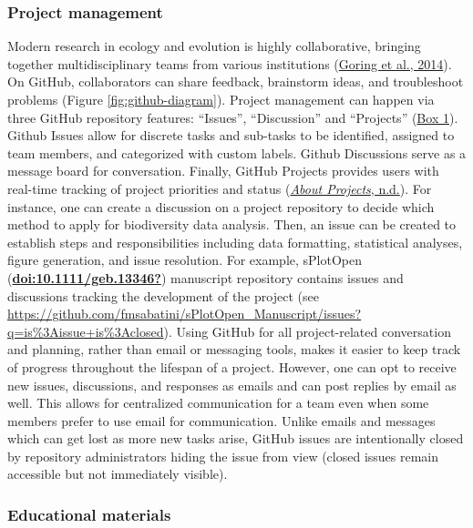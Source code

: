 \hypertarget{project-management}{%
\subsubsection{Project management}\label{project-management}}

Modern research in ecology and evolution is highly collaborative, bringing together multidisciplinary teams from various institutions (\protect\hyperlink{ref-1HhzKAC1K}{Goring et al., 2014}).
On GitHub, collaborators can share feedback, brainstorm ideas, and troubleshoot problems (Figure \ref{fig:github-diagram}).
Project management can happen via three GitHub repository features: ``Issues'', ``Discussion'' and ``Projects'' (\protect\hyperlink{definitions}{Box 1}).
Github Issues allow for discrete tasks and sub-tasks to be identified, assigned to team members, and categorized with custom labels.
Github Discussions serve as a message board for conversation.
Finally, GitHub Projects provides users with real-time tracking of project priorities and status (\protect\hyperlink{ref-RhBKe0MG}{\emph{About Projects}, n.d.}).
For instance, one can create a discussion on a project repository to decide which method to apply for biodiversity data analysis.
Then, an issue can be created to establish steps and responsibilities including data formatting, statistical analyses, figure generation, and issue resolution.
For example, sPlotOpen (\protect\hyperlink{ref-doi:10.1111ux2fgeb.13346}{\textbf{doi:10.1111/geb.13346?}}) manuscript repository contains issues and discussions tracking the development of the project (see \url{https://github.com/fmsabatini/sPlotOpen_Manuscript/issues?q=is\%3Aissue+is\%3Aclosed}).
Using GitHub for all project-related conversation and planning, rather than email or messaging tools, makes it easier to keep track of progress throughout the lifespan of a project.
However, one can opt to receive new issues, discussions, and responses as emails and can post replies by email as well.
This allows for centralized communication for a team even when some members prefer to use email for communication.
Unlike emails and messages which can get lost as more new tasks arise, GitHub issues are intentionally closed by repository administrators hiding the issue from view (closed issues remain accessible but not immediately visible).

\hypertarget{educational-materials}{%
\subsubsection{Educational materials}\label{educational-materials}}

